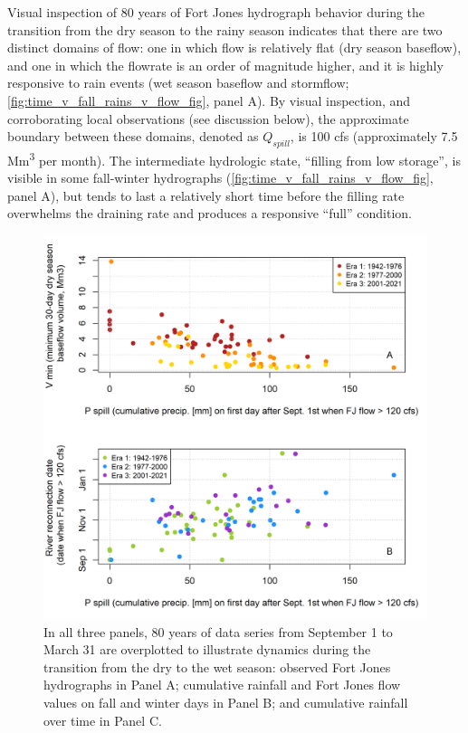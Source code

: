 \documentclass[hess, manuscript]{copernicus}
\begin{document}
Visual inspection of 80 years of Fort Jones hydrograph behavior during
the transition from the dry season to the rainy season indicates that
there are two distinct domains of flow: one in which flow is relatively
flat (dry season baseflow), and one in which the flowrate is an order of
magnitude higher, and it is highly responsive to rain events (wet season
baseflow and stormflow; \autoref{fig:time_v_fall_rains_v_flow_fig},
panel A). By visual inspection, and corroborating local observations
(see discussion below), the approximate boundary between these domains,
denoted as \(Q_{spill}\), is 100 cfs (approximately 7.5
Mm\textsuperscript{3} per month). The intermediate hydrologic state,
``filling from low storage'', is visible in some fall-winter hydrographs
(\autoref{fig:time_v_fall_rains_v_flow_fig}, panel A), but tends to last
a relatively short time before the filling rate overwhelms the draining
rate and produces a responsive ``full'' condition.

\begin{figure}
\includegraphics[width=1\linewidth]{f04} \caption{\label{fig:time_v_fall_rains_v_flow_fig} In all three panels, 80 years of data series from September 1 to March 31 are overplotted to illustrate dynamics during the transition from the dry to the wet season: observed Fort Jones hydrographs in Panel A; cumulative rainfall and Fort Jones flow values on fall and winter days in Panel B; and cumulative rainfall over time in Panel C.}\label{fig:time_v_fall_rains_v_flow_fig}
\end{figure}
\end{document}
